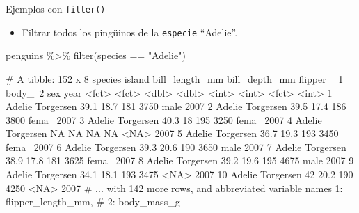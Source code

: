 \documentclass[
  ignorenonframetext,
  aspectratio=169]{beamer}
\newenvironment{Shaded}{\begin{snugshade}}{\end{snugshade}}
\newcommand{\FunctionTok}[1]{\textcolor[rgb]{0.00,0.00,0.00}{#1}}
\newcommand{\NormalTok}[1]{#1}
\newcommand{\SpecialCharTok}[1]{\textcolor[rgb]{0.00,0.00,0.00}{#1}}
\newcommand{\StringTok}[1]{\textcolor[rgb]{0.31,0.60,0.02}{#1}}
\providecommand{\tightlist}{%
  \setlength{\itemsep}{0pt}\setlength{\parskip}{0pt}}
\let\oldverbatim\verbatim
\let\endoldverbatim\endverbatim
\renewenvironment{verbatim}{\tiny\oldverbatim}{\endoldverbatim}
\begin{document}
\begin{frame}[fragile]{Ejemplos con \texttt{filter()}}
\protect\hypertarget{ejemplos-con-filter}{}
\begin{itemize}
\tightlist
\item
  Filtrar todos los pingüinos de la \texttt{especie} ``Adelie''.
\end{itemize}

\begin{Shaded}
\begin{Highlighting}[]
\NormalTok{penguins }\SpecialCharTok{\%\textgreater{}\%} 
  \FunctionTok{filter}\NormalTok{(species }\SpecialCharTok{==} \StringTok{"Adelie"}\NormalTok{)}
\end{Highlighting}
\end{Shaded}

\begin{verbatim}
# A tibble: 152 x 8
   species island    bill_length_mm bill_depth_mm flipper_~1 body_~2 sex    year
   <fct>   <fct>              <dbl>         <dbl>      <int>   <int> <fct> <int>
 1 Adelie  Torgersen           39.1          18.7        181    3750 male   2007
 2 Adelie  Torgersen           39.5          17.4        186    3800 fema~  2007
 3 Adelie  Torgersen           40.3          18          195    3250 fema~  2007
 4 Adelie  Torgersen           NA            NA           NA      NA <NA>   2007
 5 Adelie  Torgersen           36.7          19.3        193    3450 fema~  2007
 6 Adelie  Torgersen           39.3          20.6        190    3650 male   2007
 7 Adelie  Torgersen           38.9          17.8        181    3625 fema~  2007
 8 Adelie  Torgersen           39.2          19.6        195    4675 male   2007
 9 Adelie  Torgersen           34.1          18.1        193    3475 <NA>   2007
10 Adelie  Torgersen           42            20.2        190    4250 <NA>   2007
# ... with 142 more rows, and abbreviated variable names 1: flipper_length_mm,
#   2: body_mass_g
\end{verbatim}
\end{frame}
\end{document}
